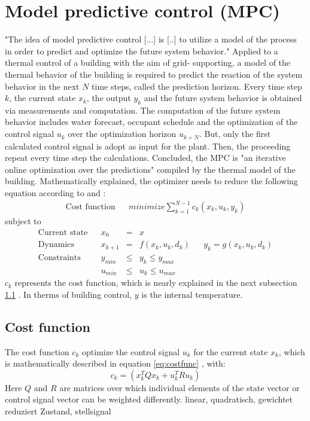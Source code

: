 \section{Model predictive control (MPC)}
\label{section:mpc}
"The idea of model predictive control [...] is [..] to utilize a model of the process in order to predict and optimize the future system behavior."
\cite{Grune.2017}
Applied to a thermal control of a building with the aim of grid- supporting, a model of the thermal behavior of the building is required to predict the reaction of the system behavior in the next $N$ time steps, called the prediction horizon. Every time step $k$, the current state \textbf{$x_k$}, the output \textbf{$y_k$} and the future system behavior is obtained via measurements and computation. The computation of the future system behavior includes water forecast, occupant schedule  and the optimization of the control signal \textbf{$u_k$} over the optimization horizon \textbf{$u_{k+N}$}. But, only the first calculated control signal is adopt as input for the plant.
Then, the proceeding repeat every time step the calculations. Concluded, the MPC is "an iterative online optimization over the predictions"
\cite{Grune.2017} 
compiled by the thermal model of the building. Mathematically explained, the optimizer needs to reduce the following equation according to
\cite{Kouvaritakis.2018}
and
\cite{Oldewurtel.2012}:
\begin{align}
\label{eq:costfunc}
\textrm{Cost function} && minimize \sum_{k=1}^{N-1} c_k(x_k,u_k,y_k)
\end{align}
subject to 
\begin{align*}
\textrm{Current state} && x_0 &=& x \\	
\textrm{Dynamics} && x_{k+1}&=& f(x_k,u_k,d_k)		&&	y_k = g(x_k,u_k,d_k)\\				
\textrm{Constraints} && y_{min}&\leq& y_k \leq y_{max}\\		
\textrm{} && u_{min}&\leq& u_k \leq u_{max}	
\end{align*}
$c_k$ represents the cost function, which is nearly explained in the next subsection  \ref{subsection:costfunction}
. In therms of building control, $y$ is the internal temperature.
\subsection{Cost function}
\label{subsection:costfunction}
The cost function $c_k$ optimize the control signal $u_k$ for the current state $x_k$, which is mathematically described in equation
\ref{eq:costfunc}
, with:
\begin{equation}
\label{eq:c_k}
c_k = (x_k^TQx_k+u_k^TRu_k)
\end{equation}
Here $Q$ and $R$ are matrices over which individual elements of the state vector or control signal vector can be weighted differently.  
\cite{Kouvaritakis.2016}
linear, quadratisch, gewichtet 
reduziert Zustand, stellsignal

